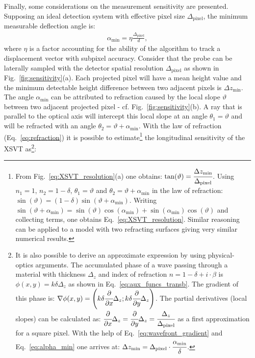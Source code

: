 \begin{refsection}
Finally, some considerations on the measurement sensitivity are presented. Supposing an ideal detection system with effective pixel size $\Delta_\text{pixel}$, the minimum measurable deflection angle is:
\begin{align}\label{eq:alpha_min}
    \alpha_\text{min}=\eta\frac{\Delta_\text{pixel}}{d},
\end{align}
where $\eta$ is a factor accounting for the ability of the algorithm to track a displacement vector with subpixel accuracy. Consider that the probe can be laterally sampled with the detector spatial resolution $\Delta_\text{pixel}$ as shown in Fig.~\ref{fig:sensitivity}(a). Each projected pixel will have a mean height value and the minimum detectable height difference between two adjacent pixels is $\Delta{z_{\text{min}}}$. The angle $\alpha_\text{min}$ can be attributed to refraction caused by the local slope $\vartheta$ between two adjacent projected pixel - cf. Fig.~\ref{fig:sensitivity}(b). A ray that is parallel to the optical axis will intercept this local slope at an angle $\theta_1=\vartheta$ and will be refracted with an angle $\theta_2=\vartheta+\alpha_\text{min}$. With the law of refraction (Eq.~\ref{eq:refraction}) it is possible to estimate\footnote{From Fig.~\ref{eq:XSVT_resolution}(a) one obtains: $\tan(\vartheta)=\cfrac{\Delta{z_{\text{min}}}}{\Delta_\text{pixel}}$. Using $n_1=1$, $n_2=1-\delta$, $\theta_1=\vartheta$ and  $\theta_2=\vartheta+\alpha_\text{min}$ in the law of refraction: $\sin(\vartheta)=(1-\delta)\sin(\vartheta+\alpha_\text{min})$. Writing $\sin(\vartheta+\alpha_\text{min})=\sin(\vartheta)\cos(\alpha_\text{min})+\sin(\alpha_\text{min})\cos(\vartheta)$ and collecting terms, one obtains Eq.~\ref{eq:XSVT_resolution}. Similar reasoning can be applied to a model with two refracting surfaces giving very similar numerical results.} the longitudinal sensitivity of the XSVT as\footnote{It is also possible to derive an approximate expression by using physical-optics arguments. The accumulated phase of a wave passing through a material with thickness $\Delta_z$ and index of refraction $n=1-\delta+i\cdot\beta$ is $\phi(x,y)=k\delta\Delta_z$ as shown in Eq.~\ref{eq:aux_funcs_transb}. The gradient of this phase is: $\nabla \phi(x,y)=\Bigg(k\delta\cfrac{\partial}{\partial x}\Delta_z; k\delta\cfrac{\partial}{\partial y}\Delta_z\Bigg)$. The partial derivatives (local slopes) can be calculated as: $\cfrac{\partial}{\partial x}\Delta_z = \cfrac{\partial}{\partial y}\Delta_z = \cfrac{\Delta_z}{ \Delta_\text{pixel}}$ as a first approximation for a square pixel. With the help of Eq.~\ref{eq:wavefront_gradient} and Eq.~\ref{eq:alpha_min} one arrives at: $\Delta{z_{\text{min}}}=\Delta_\text{pixel}\cdot\cfrac{\alpha_\text{min}}{\delta}$.}: 

\end{refsection}
